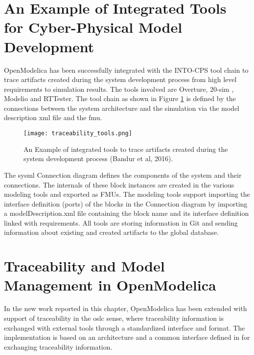 \section{An Example of Integrated Tools for Cyber-Physical Model Development}
\label{sec:tracaebilitytools}

OpenModelica has been successfully integrated with the INTO-CPS tool chain to trace artifacts created
during the system development process from high level requirements to simulation results. The tools involved
are Overture, 20-sim , Modelio and RTTester. The tool chain as shown in Figure \ref{fig:traceabilitytools} is defined by the connections between the system architecture and the simulation via the model description \acrshort{xml} file and the \acrshort{fmu}.

\begin{landscape}
	\begin{figure}
		\texttt{[image: traceability\_tools.png]}
		\caption{An Example of integrated tools to trace artifacts created during the system development process (Bandur et al, 2016).}
		\label{fig:traceabilitytools}
	\end{figure}
\end{landscape}

The \acrshort{sysml} Connection diagram defines the components of the system and their connections. The
internals of these block instances are created in the various modeling tools and exported as FMUs. 
The modeling tools support importing the interface definition (ports) of the blocks in the Connection
diagram by importing a modelDescription.xml file containing the block name and its interface definition
linked with requirements. All tools are storing information in Git and sending information about
existing and created artifacts to the global database.

\section{Traceability and Model Management in OpenModelica}
\label{sec:tracaebilityactivities}

In the new work reported in this chapter, OpenModelica has been extended with support of traceability in the \acrshort{oslc} sense, 
where traceability information is exchanged with external tools through a standardized interface and format. The implementation is based on
an architecture and a common interface defined in \cite{intocpskenneth} for exchanging traceability information. 

